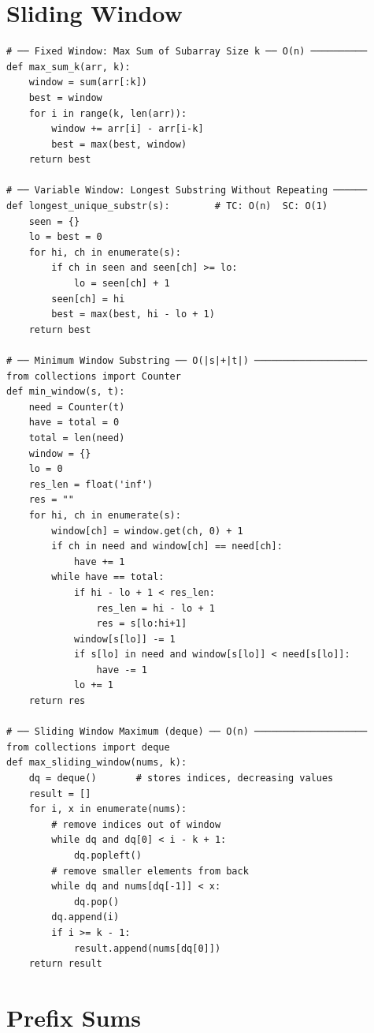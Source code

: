\documentclass[11pt,a4paper]{report}
\begin{document}
\section{Sliding Window}

\begin{lstlisting}
# ── Fixed Window: Max Sum of Subarray Size k ── O(n) ──────────
def max_sum_k(arr, k):
    window = sum(arr[:k])
    best = window
    for i in range(k, len(arr)):
        window += arr[i] - arr[i-k]
        best = max(best, window)
    return best

# ── Variable Window: Longest Substring Without Repeating ──────
def longest_unique_substr(s):        # TC: O(n)  SC: O(1)
    seen = {}
    lo = best = 0
    for hi, ch in enumerate(s):
        if ch in seen and seen[ch] >= lo:
            lo = seen[ch] + 1
        seen[ch] = hi
        best = max(best, hi - lo + 1)
    return best

# ── Minimum Window Substring ── O(|s|+|t|) ────────────────────
from collections import Counter
def min_window(s, t):
    need = Counter(t)
    have = total = 0
    total = len(need)
    window = {}
    lo = 0
    res_len = float('inf')
    res = ""
    for hi, ch in enumerate(s):
        window[ch] = window.get(ch, 0) + 1
        if ch in need and window[ch] == need[ch]:
            have += 1
        while have == total:
            if hi - lo + 1 < res_len:
                res_len = hi - lo + 1
                res = s[lo:hi+1]
            window[s[lo]] -= 1
            if s[lo] in need and window[s[lo]] < need[s[lo]]:
                have -= 1
            lo += 1
    return res

# ── Sliding Window Maximum (deque) ── O(n) ────────────────────
from collections import deque
def max_sliding_window(nums, k):
    dq = deque()       # stores indices, decreasing values
    result = []
    for i, x in enumerate(nums):
        # remove indices out of window
        while dq and dq[0] < i - k + 1:
            dq.popleft()
        # remove smaller elements from back
        while dq and nums[dq[-1]] < x:
            dq.pop()
        dq.append(i)
        if i >= k - 1:
            result.append(nums[dq[0]])
    return result
\end{lstlisting}

\section{Prefix Sums}
\end{document}
